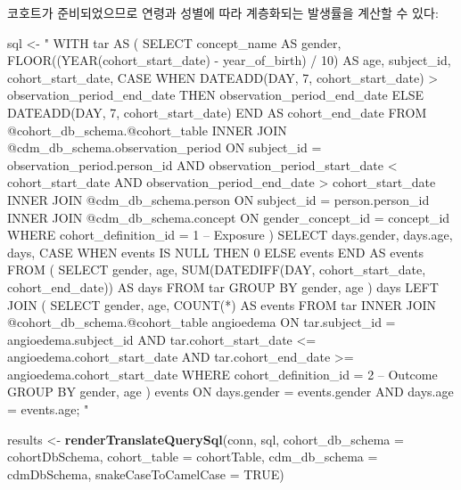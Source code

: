\documentclass[11pt]{book}
\newenvironment{Shaded}{\begin{snugshade}}{\end{snugshade}}
\newcommand{\KeywordTok}[1]{\textcolor[rgb]{0.13,0.29,0.53}{\textbf{#1}}}
\newcommand{\DataTypeTok}[1]{\textcolor[rgb]{0.13,0.29,0.53}{#1}}
\newcommand{\StringTok}[1]{\textcolor[rgb]{0.31,0.60,0.02}{#1}}
\newcommand{\OtherTok}[1]{\textcolor[rgb]{0.56,0.35,0.01}{#1}}
\newcommand{\NormalTok}[1]{#1}
\theoremstyle{definition}
\theoremstyle{definition}
\theoremstyle{definition}
\theoremstyle{remark}
\begin{document}
코호트가 준비되었으므로 연령과 성별에 따라 계층화되는 발생률을 계산할 수
있다:

\begin{Shaded}
\begin{Highlighting}[]
\NormalTok{sql <-}\StringTok{ "}
\StringTok{WITH tar AS (}
\StringTok{  SELECT concept_name AS gender,}
\StringTok{    FLOOR((YEAR(cohort_start_date) -}
\StringTok{          year_of_birth) / 10) AS age,}
\StringTok{    subject_id,}
\StringTok{    cohort_start_date,}
\StringTok{    CASE WHEN DATEADD(DAY, 7, cohort_start_date) >}
\StringTok{      observation_period_end_date}
\StringTok{    THEN observation_period_end_date}
\StringTok{    ELSE DATEADD(DAY, 7, cohort_start_date)}
\StringTok{    END AS cohort_end_date}
\StringTok{  FROM @cohort_db_schema.@cohort_table}
\StringTok{  INNER JOIN @cdm_db_schema.observation_period}
\StringTok{    ON subject_id = observation_period.person_id}
\StringTok{      AND observation_period_start_date < cohort_start_date}
\StringTok{      AND observation_period_end_date > cohort_start_date}
\StringTok{  INNER JOIN @cdm_db_schema.person}
\StringTok{    ON subject_id = person.person_id}
\StringTok{  INNER JOIN @cdm_db_schema.concept}
\StringTok{    ON gender_concept_id = concept_id}
\StringTok{  WHERE cohort_definition_id = 1 -- Exposure}
\StringTok{)}
\StringTok{SELECT days.gender,}
\StringTok{    days.age,}
\StringTok{    days,}
\StringTok{    CASE WHEN events IS NULL THEN 0 ELSE events END AS events}
\StringTok{FROM (}
\StringTok{  SELECT gender,}
\StringTok{    age,}
\StringTok{    SUM(DATEDIFF(DAY, cohort_start_date,}
\StringTok{      cohort_end_date)) AS days}
\StringTok{  FROM tar}
\StringTok{  GROUP BY gender,}
\StringTok{    age}
\StringTok{) days}
\StringTok{LEFT JOIN (}
\StringTok{  SELECT gender,}
\StringTok{      age,}
\StringTok{      COUNT(*) AS events}
\StringTok{  FROM tar}
\StringTok{  INNER JOIN @cohort_db_schema.@cohort_table angioedema}
\StringTok{    ON tar.subject_id = angioedema.subject_id}
\StringTok{      AND tar.cohort_start_date <= angioedema.cohort_start_date}
\StringTok{      AND tar.cohort_end_date >= angioedema.cohort_start_date}
\StringTok{  WHERE cohort_definition_id = 2 -- Outcome}
\StringTok{  GROUP BY gender,}
\StringTok{    age}
\StringTok{) events}
\StringTok{ON days.gender = events.gender}
\StringTok{  AND days.age = events.age;}
\StringTok{"}

\NormalTok{results <-}\StringTok{ }\KeywordTok{renderTranslateQuerySql}\NormalTok{(conn, sql,}
                                   \DataTypeTok{cohort_db_schema =}\NormalTok{ cohortDbSchema,}
                                   \DataTypeTok{cohort_table =}\NormalTok{ cohortTable,}
                                   \DataTypeTok{cdm_db_schema =}\NormalTok{ cdmDbSchema,}
                                   \DataTypeTok{snakeCaseToCamelCase =} \OtherTok{TRUE}\NormalTok{)}
\end{Highlighting}
\end{Shaded}
\end{document}
